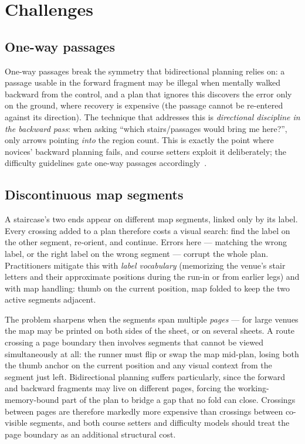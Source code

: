 \documentclass[11pt,a4paper,twocolumn]{article}
\begin{document}
\section{Challenges}
\label{sec:challenges}

\subsection{One-way passages}
One-way passages break the symmetry that bidirectional planning relies on: a
passage usable in the forward fragment may be illegal when mentally walked
backward from the control, and a plan that ignores this discovers the error
only on the ground, where recovery is expensive (the passage cannot be
re-entered against its direction). The technique that addresses this is
\emph{directional discipline in the backward pass}: when asking ``which
stairs/passages would bring me here?'', only arrows pointing \emph{into} the
region count. This is exactly the point where novices' backward planning
fails, and course setters exploit it deliberately; the difficulty guidelines
gate one-way passages accordingly~\cite{framework}.

\subsection{Discontinuous map segments}
A staircase's two ends appear on different map segments, linked only by its
label. Every crossing added to a plan therefore costs a visual search: find
the label on the other segment, re-orient, and continue. Errors here ---
matching the wrong label, or the right label on the wrong segment --- corrupt
the whole plan. Practitioners mitigate this with \emph{label vocabulary}
(memorizing the venue's stair letters and their approximate positions during
the run-in or from earlier legs) and with map handling: thumb on the current
position, map folded to keep the two active segments adjacent.

The problem sharpens when the segments span multiple \emph{pages} --- for
large venues the map may be printed on both sides of the sheet, or on
several sheets. A route crossing a page boundary then involves segments that
cannot be viewed simultaneously at all: the runner must flip or swap the map
mid-plan, losing both the thumb anchor on the current position and any
visual context from the segment just left. Bidirectional planning suffers
particularly, since the forward and backward fragments may live on different
pages, forcing the working-memory-bound part of the plan to bridge a gap
that no fold can close. Crossings between pages are therefore markedly more
expensive than crossings between co-visible segments, and both course
setters and difficulty models should treat the page boundary as an
additional structural cost.
\end{document}
